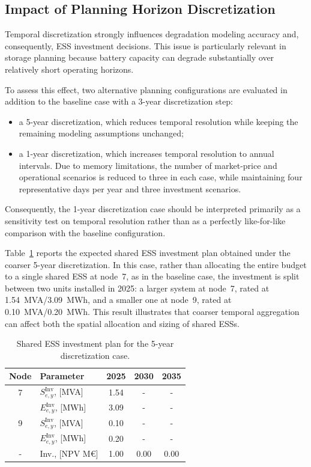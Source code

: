 \documentclass[preprint,12pt]{elsarticle}
\begin{document}
\subsection{Impact of Planning Horizon Discretization}

Temporal discretization strongly influences degradation modeling accuracy and, consequently, ESS investment decisions. This issue is particularly relevant in storage planning because battery capacity can degrade substantially over relatively short operating horizons.

To assess this effect, two alternative planning configurations are evaluated in addition to the baseline case with a 3-year discretization step:
\begin{itemize}
    \item a 5-year discretization, which reduces temporal resolution while keeping the remaining modeling assumptions unchanged;
    \item a 1-year discretization, which increases temporal resolution to annual intervals. Due to memory limitations, the number of market-price and operational scenarios is reduced to three in each case, while maintaining four representative days per year and three investment scenarios.
\end{itemize}

Consequently, the 1-year discretization case should be interpreted primarily as a sensitivity test on temporal resolution rather than as a perfectly like-for-like comparison with the baseline configuration.

Table~\ref{tab:cs3_shared_ess_investment_plan_5year_discretization} reports the expected shared ESS investment plan obtained under the coarser 5-year discretization. In this case, rather than allocating the entire budget to a single shared ESS at node~7, as in the baseline case, the investment is split between two units installed in 2025: a larger system at node~7, rated at 1.54~MVA/3.09~MWh, and a smaller one at node~9, rated at 0.10~MVA/0.20~MWh. This result illustrates that coarser temporal aggregation can affect both the spatial allocation and sizing of shared ESSs.

\begin{table}[htbp!]
    \centering
    \caption{Shared ESS investment plan for the 5-year discretization case.}
    \centering
    \begin{tabular}{cl ccc}
        \toprule
        Node & Parameter                   & 2025 & 2030 & 2035\\ 
        \midrule
        7 & $S^{\text{Inv}}_{e,y}$, [MVA]  & 1.54  & - & - \\
        ~ & $E^{\text{Inv}}_{e,y}$, [MWh]  & 3.09  & - & - \\
        \midrule
        9 & $S^{\text{Inv}}_{e,y}$, [MVA]  & 0.10  & - & - \\
        ~ & $E^{\text{Inv}}_{e,y}$, [MWh]  & 0.20  & - & - \\
        \midrule
        - & Inv., [NPV M\euro]             & 1.00  & 0.00  & 0.00 \\
        \bottomrule
    \end{tabular}
    \label{tab:cs3_shared_ess_investment_plan_5year_discretization}
\end{table}
\end{document}
